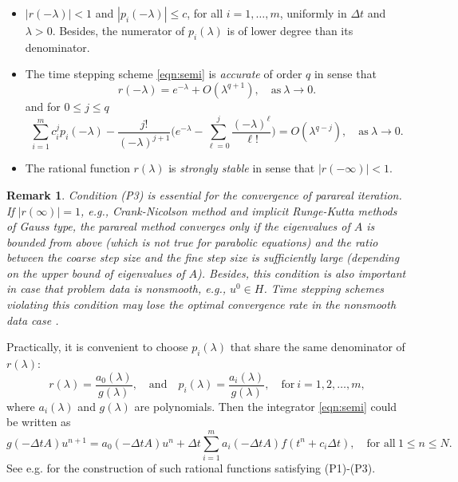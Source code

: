 \documentclass[a4paper, oneside]{book}
\newtheorem{remark}{Remark}[section]
\begin{document}
\begin{itemize}
\item[{\bf (P1)}] $| r (-\lambda)|< 1$ and $|p_i(-\lambda)|\le c$, for all $i=1,\ldots,m$,
uniformly in ${\Delta t}$ and $\lambda > 0$. Besides, the numerator of $p_i(\lambda)$
is of lower degree than its denominator.
\item[{\bf (P2)}] The time stepping scheme \eqref{eqn:semi}  is \textsl{accurate} of order $q$ in sense that
$$  r (-\lambda) = e^{-\lambda} + O(\lambda^{q+1}),\quad \text{as}~\lambda\rightarrow0. $$
and for $0\le j\le q$
$$ \sum_{i=1}^m c_i^j p_i(-\lambda) - \frac{j!}{(-\lambda)^{j+1}}\Big(e^{-\lambda}
- \sum_{\ell=0}^j \frac{(-\lambda)^\ell}{\ell!}\Big) = O(\lambda^{q-j}),\quad \text{as}~\lambda\rightarrow0. $$
\item[{\bf (P3)}] The rational function $r(\lambda)$ is \textsl{strongly stable} in sense that $|r(-\infty)|<1$.
\end{itemize}\vskip5pt

\begin{remark}
Condition (P3) is essential for the convergence of parareal iteration.
If $|r(\infty)| = 1$, e.g., Crank-Nicolson method and implicit Runge-Kutta methods of Gauss type,
the parareal method converges only if the eigenvalues of $A$ is bounded from above
(which is not true for parabolic equations)
and the ratio between the coarse step size and the fine step size is sufficiently large (depending on the upper bound of eigenvalues of $A$). Besides, this condition is also important in case that problem data is nonsmooth, e.g., $u^0\in H$. Time stepping schemes violating this condition may lose the optimal convergence rate in the nonsmooth data case \cite[Chapter 8]{Thomee:2006}.
\end{remark}

Practically, it is convenient to choose $p_i(\lambda)$ that share the same denominator of $ r (\lambda)$:
$$ r (\lambda) = \frac{a_0(\lambda)}{g(\lambda)},\quad \text{and} \quad p_i(\lambda) = \frac{a_i(\lambda)}{g(\lambda)},\quad \text{for}~i=1,2,\ldots,m,$$
where $a_i(\lambda)$ and $g(\lambda)$ are polynomials.
Then the integrator \eqref{eqn:semi} could be written as
\begin{equation*}
g(-{\Delta t} A) u^{n+1} = a_0(-{\Delta t} A) u^{n} + {\Delta t} \sum_{i=1}^m a_i(-{\Delta t} A) f(t^n+c_i\Delta t) ,\quad \text{for all}~1 \le n\le N.
\end{equation*}
See e.g. \cite[pp. 131]{Thomee:2006} for the construction of such rational functions satisfying (P1)-(P3).\vskip5pt
\end{document}
